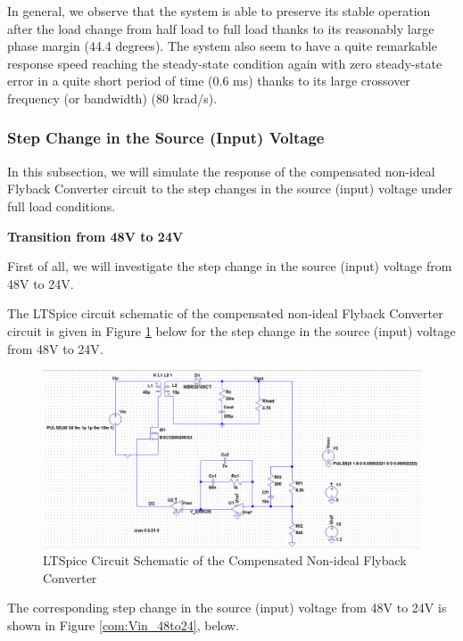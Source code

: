 In general, we observe that the system is able to preserve its stable operation after the load change from half load to full load thanks to its reasonably large phase margin (44.4 degrees). The system also seem to have a quite remarkable response speed reaching the steady-state condition again with zero steady-state error in a quite short period of time (0.6 ms) thanks to its large crossover frequency (or bandwidth) (80 krad/s).

\subsubsection{Step Change in the Source (Input) Voltage}

In this subsection, we will simulate the response of the compensated non-ideal Flyback Converter circuit to the step changes in the source (input) voltage under full load conditions.

\textbf{Transition from 48V to 24V}

First of all, we will investigate the step change in the source (input) voltage from 48V to 24V.

The LTSpice circuit schematic of the compensated non-ideal Flyback Converter circuit is given in Figure \ref{com:schematic_48to24} below for the step change in the source (input) voltage from 48V to 24V.

\begin{figure}[H]
\begin{center}
\includegraphics[width=1\textwidth]{comp_simulations/schematic_48to24.png}
\caption{LTSpice Circuit Schematic of the Compensated Non-ideal Flyback Converter}
\label{com:schematic_48to24}
\end{center}
\end{figure}

The corresponding step change in the source (input) voltage from 48V to 24V is shown in Figure \ref{com:Vin_48to24}, below.

